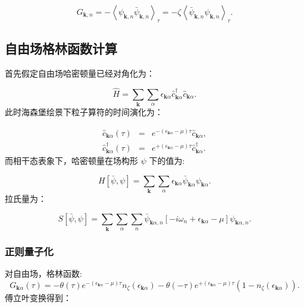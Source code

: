 \documentclass[UTF8]{ctexart}
\begin{document}
\begin{equation}
G_{\bm{k},n}=-\left\langle \psi_{\bm{k},n}\bar{\psi}_{\bm{k},n}\right\rangle _{\tau}=-\zeta\left\langle \bar{\psi}_{\bm{k},n}\psi_{\bm{k},n}\right\rangle _{\tau}.
\end{equation}


\subsection{自由场格林函数计算}

首先假定自由场哈密顿量已经对角化为：

\begin{equation}
\hat{H}=\sum_{\bm{k}}\sum_{\alpha}\epsilon_{\bm{k}\alpha}\hat{c}_{\bm{k}\alpha}^{\dagger}\hat{c}_{\bm{k}\alpha}.
\end{equation}
此时海森堡绘景下粒子算符的时间演化为：

\begin{eqnarray}
\hat{c}_{\bm{k}\alpha}\left(\tau\right) & = & e^{-\left(\epsilon_{\bm{k}\alpha}-\mu\right)\tau}\hat{c}_{\bm{k}\alpha},\\
\hat{c}_{\bm{k}\alpha}^{\dagger}\left(\tau\right) & = & e^{+\left(\epsilon_{\bm{k}\alpha}-\mu\right)\tau}\hat{c}_{\bm{k}\alpha}^{\dagger}.
\end{eqnarray}
而相干态表象下，哈密顿量在场构形 $\psi$ 下的值为:

\begin{equation}
H\left[\bar{\psi},\psi\right]=\sum_{\bm{k}}\sum_{\alpha}\epsilon_{\bm{k}\alpha}\bar{\psi}_{\bm{k}\alpha}\psi_{\bm{k}\alpha}.
\end{equation}
拉氏量为：

\begin{equation}
S\left[\bar{\psi},\psi\right]=\sum_{\bm{k}}\sum_{\alpha}\sum_{n}\bar{\psi}_{\bm{k}\alpha,n}\left[-i\omega_{n}+\epsilon_{\bm{k}\alpha}-\mu\right]\psi_{\bm{k}\alpha,n}.
\end{equation}


\subsubsection{正则量子化}

对自由场，格林函数:
\begin{equation}
G_{\bm{k}\alpha}\left(\tau\right)=-\theta\left(\tau\right)e^{-\left(\epsilon_{\bm{k}\alpha}-\mu\right)\tau}n_{\zeta}\left(\epsilon_{\bm{k}\alpha}\right)-\theta\left(-\tau\right)e^{+\left(\epsilon_{\bm{k}\alpha}-\mu\right)\tau}\left(1-n_{\zeta}\left(\epsilon_{\bm{k}\alpha}\right)\right).
\end{equation}
傅立叶变换得到：
\end{document}
